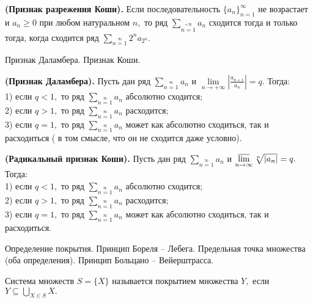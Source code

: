 \begin{theorem}\textbf{(Признак разрежения Коши).}
	Если последовательность
	$\{a_n\}_{n=1}^{\infty}$ не возрастает
	и $a_n\geq0$ при любом натуральном
	$n,$ то ряд
	$\sum\limits_{n=1}\limits^{+\infty}a_n$
	сходится тогда и только тогда, когда
	сходится ряд
	$\sum\limits_{n=1}\limits^{\infty}2^na_{2^n}.$
\end{theorem}

\newpage
\begin{problem}
Признак Даламбера. Признак Коши.
\end{problem}

\begin{theorem} \textbf{(Признак Даламбера).}
	Пусть дан ряд
	$\sum\limits_{n=1}\limits^{\infty}a_n$
	и $\lim\limits_{n\rightarrow+\infty}
		\left|\frac{a_{n+1}}{a_n}\right|=q.$
	Тогда:\\
	1) если $q<1,$ то ряд
	$\sum\limits_{n=1}\limits^{\infty}a_n$
	абсолютно сходится;\\
	2) если $q>1,$ то ряд
	$\sum\limits_{n=1}\limits^{\infty}a_n$
	расходится;\\
	3) если $q=1,$ то ряд
	$\sum\limits_{n=1}\limits^{\infty}a_n$
	может как абсолютно сходиться, так и
	расходиться ( в том смысле, что он
	не сходится даже условно).
\end{theorem}

\begin{theorem} \textbf{(Радикальный признак Коши).}
	Пусть дан ряд
	$\sum\limits_{n=1}\limits^{\infty}a_n$
	и $\operatorname*{\overline{lim}}\limits_{n\rightarrow\infty}
		\sqrt[n]{|a_n|}=q.$
	Тогда:\\
	1) если $q<1,$ то ряд
	$\sum\limits_{n=1}\limits^{\infty}a_n$
	абсолютно сходится;\\
	2) если $q>1,$ то ряд
	$\sum\limits_{n=1}\limits^{\infty}a_n$
	расходится;\\
	3) если $q=1,$ то ряд
	$\sum\limits_{n=1}\limits^{\infty}a_n$
	может как абсолютно сходиться, так и расходиться.
\end{theorem}

\newpage
\begin{problem}
Определение покрытия. Принцип Бореля – Лебега. Предельная точка множества (оба
определения). Принцип Больцано – Вейерштрасса.
\end{problem}
\begin{definition}
	Система множеств $S=\{X\}$ называется
	покрытием множества $Y,$ если
	$Y\subseteq\bigcup\limits_{X\in S}X.$
\end{definition}

